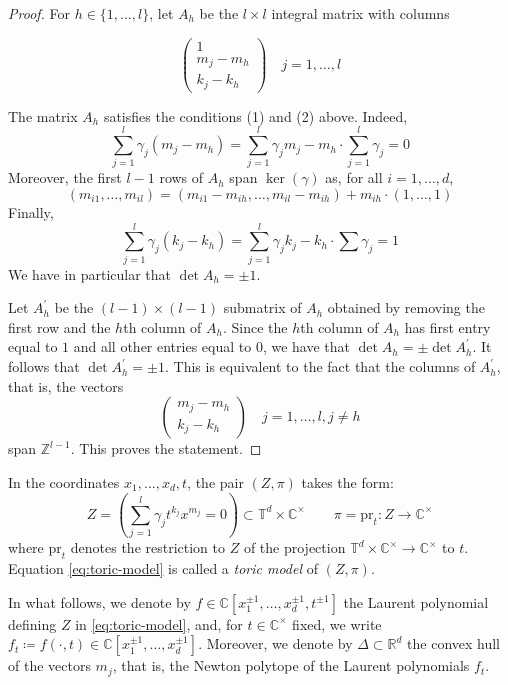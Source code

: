 \documentclass[11pt, reqno]{amsart}
\theoremstyle{plain}
\theoremstyle{definition}
\newcommand{\CC}{\mathbb{C}}
\newcommand{\ZZ}{\mathbb{Z}}
\newcommand{\RR}{\mathbb{R}}
\newcommand{\TT}{\mathbb{T}}
\begin{document}
\begin{proof}
For $h \in \{1, \dots, l\}$, let $A_h$ be the $l \times l$ integral matrix with columns

\[
\label{eq:A_h}
    \begin{pmatrix}
1  \\
m_{j}-m_h\\
k_j -k_h
\end{pmatrix} \quad 
     j=1, \dots, l
\]
\vspace{0.01cm}

\noindent The matrix $A_h$ satisfies the conditions (1) and (2) above. Indeed, 
    \[ \sum_{j=1}^l \gamma_j (m_j-m_h)= \sum_{j=1}^l \gamma_j m_j-m_h \cdot \sum_{j=1}^l\gamma_j=0
    \]
    Moreover, the first $l-1$ rows of $A_h$ span $\ker(\gamma)$ as, for all $i=1, \dots, d$, 
    \[
    (m_{i1}, \dots, m_{il})=(m_{i1}-m_{ih}, \dots, m_{il}-m_{ih})+m_{ih}\cdot (1, \dots, 1)
    \]
    Finally, 
    \[
    \sum_{j=1}^l \gamma_j (k_j-k_h)= \sum_{j=1}^l \gamma_j k_j -k_h \cdot \sum \gamma_j=1
    \]
We have in particular that $\det A_h=\pm1$. 

Let $A^{'}_h$ be the $(l-1) \times (l-1)$ submatrix of $A_h$ obtained by removing the first row and the $h$th column of $A_h$. Since the $h$th column of $A_h$ has first entry equal to $1$ and all other entries equal to $0$, we have that $\det A_h= \pm \det A^{\prime}_h$. 
It follows that $\det A^{\prime}_h=\pm 1$.
This is equivalent to the fact that the columns of $A^{\prime}_h$, that is, the vectors 
\[
\begin{pmatrix}
m_{j}-m_h\\
k_j -k_h
\end{pmatrix} \quad 
     j=1, \dots, l, j \neq h
\] span $\ZZ^{l-1}$. This proves the statement. 
\end{proof}



In the coordinates $x_1, \dots, x_d,  t$, the pair $(Z, \pi)$ takes the form: 
\begin{equation}
\label{eq:toric-model}
   Z= \left(  \sum_{j=1}^l \gamma_j t^{k_j} x^{m_j}=0
   \right)
\subset \TT^d \times \CC^\times  \qquad \pi=\mathrm{pr}_t \colon Z \to \CC^\times 
\end{equation}
where 
$\mathrm{pr}_t$ denotes the restriction to $Z$ of the projection $\TT^d \times \CC^\times \to \CC^\times$ to $t$. Equation \eqref{eq:toric-model} is called a \emph{toric model} of $(Z, \pi)$. 

In what follows, we denote by $f \in \CC[x_1^{\pm 1}, \dots, x_d^{\pm 1}, t^{\pm 1}]$ the Laurent polynomial defining  $Z$ in \eqref{eq:toric-model}, and, for $t \in \CC^\times$ fixed, we write $f_t \coloneqq f(\cdot,t) \in \CC[x_1^{\pm 1}, \dots, x_d^{\pm 1}]$.
Moreover, we denote by $\Delta \subset \RR^d$ the convex hull of the vectors $m_j$, that is, the Newton polytope of the Laurent polynomials  $f_t$. 
\end{document}
